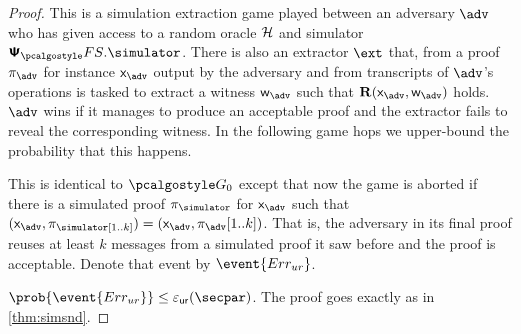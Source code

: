 \documentclass[runningheads,11pt]{llncs}
\begin{document}
\begin{proof}		

   This is a simulation extraction game played between an adversary
  $\advse$ who has given access to a random oracle $\mathcal{H}$ and simulator
  $\psfs.\simulator$. There is also an extractor $\ext$ that, from a proof
  $\zkproof_{\advse}$ for instance $\inp_{\advse}$ output by the adversary and from
   transcripts of $\advse$'s operations is tasked to extract a witness
  $\wit_{\advse}$ such that $\REL(\inp_{\advse}, \wit_{\advse})$ holds. $\advse$ wins
  if it manages to produce an acceptable proof and the extractor fails to reveal
  the corresponding witness. In the following game hops we upper-bound the
  probability that this happens.

   This is identical to $\game{0}$ except that now the game is aborted
  if there is a simulated proof $\zkproof_\simulator$ for $\inp_{\advse}$ such
  that $(\inp_{\advse}, \zkproof_\simulator[1..k]) = (\inp_{\advse},
  \zkproof_{\advse}[1..k])$. That is, the adversary in its final proof
  reuses at least $k$ messages from a simulated proof it saw before and the proof is acceptable.
  Denote that event by $\event{\errur}$.

   $\prob{\event{\errur}} \leq \epsur(\secpar)$. The
  proof goes exactly as in \cref{thm:simsnd}.

\end{proof}
\end{document}

